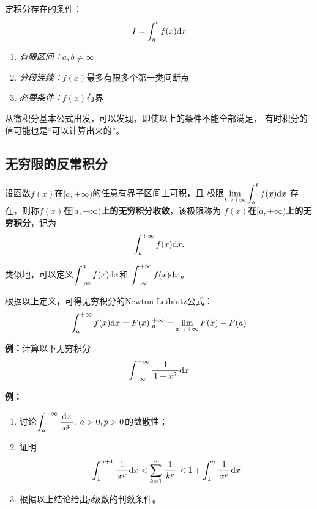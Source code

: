 定积分存在的条件：
$${I=\displaystyle\int_a^bf(x)\mathrm{d} x}$$
\begin{enumerate} [(1)]
  \setlength{\itemindent}{1cm}
  \item {\it 有限区间：}$a,b\ne \infty$
  \item {\it 分段连续：}$f(x)$最多有限多个第一类间断点 
  \item {\it 必要条件：}$f(x)$有界
\end{enumerate}

从微积分基本公式出发，可以发现，即使以上的条件不能全部满足，
有时积分的值可能也是“可以计算出来的”。

\subsection{无穷限的反常积分}

\begin{thx}
	设函数$f(x)$在$[a,+\infty)$的任意有界子区间上可积，且
	极限$\lim\limits_{t\to+\infty}\displaystyle\int_a^tf(x)\mathrm{d} x$
	存在，则称{\bf $f(x)$在$[a,+\infty)$上的无穷积分收敛}，该极限称为
	{\bf $f(x)$在$[a,+\infty)$上的无穷积分}，记为
	$$\displaystyle\int_a^{+\infty}f(x)\mathrm{d} x.$$
\end{thx}
类似地，可以定义${\displaystyle\int_{-\infty}^af(x)\mathrm{d} x}$和
${\displaystyle\int_{-\infty}^{+\infty}f(x)\mathrm{d} x}$。

根据以上定义，可得无穷积分的Newton-Leibnitz公式：
  $$\displaystyle\int_a^{+\infty}f(x)\mathrm{d} x=F(x)|_{a}^{+\infty}
  =\lim\limits_{x\to{+\infty}}F(x)-F(a)$$
  
{\bf 例：}计算以下无穷积分
$$\displaystyle\int_{-\infty}^{+\infty}\displaystyle\frac{\,{1}\,}{\,{1+x^2}\,}\mathrm{d} x$$

\begin{center}
\end{center}

{\bf 例：}
\begin{enumerate}[(1)]
  \setlength{\itemindent}{1cm}
  \item 讨论$\displaystyle\int_a^{+\infty}\displaystyle\frac{\,{\mathrm{d} x}\,}{\,{x^p}\,},\;a>0, p>0$的敛散性； 
  \item 证明$$\displaystyle\int_1^{n+1}\displaystyle\frac{\,{1}\,}{\,{x^p}\,}\mathrm{d} x<\sum\limits_{k=1}^n\displaystyle\frac{\,{1}\,}{\,{k^p}\,}
  <1+\displaystyle\int_1^n\displaystyle\frac{\,{1}\,}{\,{x^p}\,}\mathrm{d} x$$ 
  \item 根据以上结论给出$p$级数的判敛条件。
\end{enumerate}

